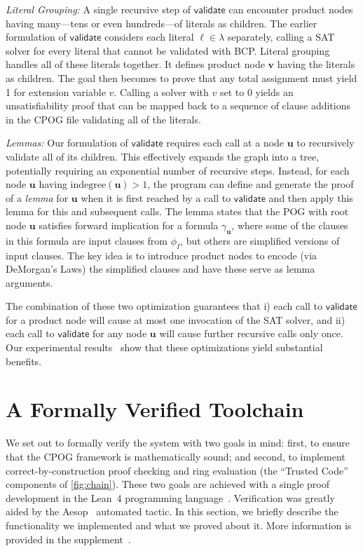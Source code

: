 \documentclass[letterpaper,USenglish,cleveref, autoref, thm-restate]{lipics-v2021}
\newcommand{\lit}{\ell}
\newcommand{\indegree}{\textrm{indegree}}
\newcommand{\validate}{\textsf{validate}}
\newcommand{\inputformula}{\phi_I}
\newcommand{\makenode}[1]{\mathbf{#1}}
\newcommand{\nodeu}{\makenode{u}}
\newcommand{\nodev}{\makenode{v}}
\newcommand{\lean}{Lean~4}
\begin{document}
\emph{Literal Grouping:} A single recursive step of $\validate$ can encounter product nodes
having many---tens or even hundreds---of literals as children.  The
earlier formulation of $\validate$ considers each literal $\lit \in \lambda$
separately, calling a SAT solver for every literal that cannot be
validated with BCP\@.  Literal grouping handles
all of these literals together.  It defines product node $\nodev$
having the literals as children.  The goal then becomes to prove that
any total assignment must yield 1 for extension variable $v$.  Calling
a solver with $v$ set to 0 yields an unsatisfiability proof that can
be mapped back to a sequence of clause additions in the CPOG file validating
all of the literals.

\emph{Lemmas:} Our formulation of $\validate$ requires each call at a
node $\nodeu$ to recursively validate all of its children.  This
effectively expands the graph into a tree, potentially requiring an
exponential number of recursive steps.  Instead, for each node
$\nodeu$ having $\indegree(\nodeu) > 1$, the program can define and
generate the proof of a \emph{lemma} for $\nodeu$ when it is first reached by
a call to $\validate$ and then apply this lemma for this and
subsequent calls.  The lemma states that the POG with root node
$\nodeu$ satisfies forward implication for a formula
$\gamma_{\nodeu}$, where some of the clauses in this formula are
input clauses from $\inputformula$, but others are simplified
versions of input clauses.
The key idea is to introduce product nodes to encode (via DeMorgan's
Laws) the simplified clauses and have these serve as lemma arguments.

The combination of these two optimization guarantees that i) each call
to $\validate$ for a product node will cause at most one invocation of
the SAT solver, and ii) each call to $\validate$ for any node $\nodeu$
will cause further recursive calls only once.  Our experimental
results~\cite{bryant:sat:2023:supplement} show that these
optimizations yield substantial benefits.



\section{A Formally Verified Toolchain}
\label{section:formally-verified-toolchain}

We set out to formally verify the system with two goals in mind: first, to ensure that the CPOG framework is mathematically
sound; and second, to implement correct-by-construction proof checking and ring evaluation (the ``Trusted Code'' components of \cref{fig:chain}). These two goals are achieved with a single proof development in the \lean{} programming language~\cite{demoura:cade:2021}. Verification was greatly aided by the Aesop~\cite{23limperg_aesop_white_box_best_first_proof_search_lean} automated tactic. In this section, we briefly describe the functionality we implemented and what we proved about it. More information is provided in the supplement~\cite{bryant:sat:2023:supplement}.
\end{document}
